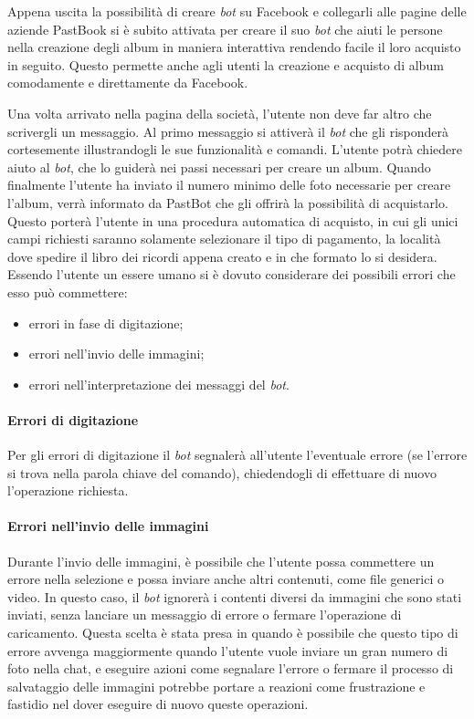 Appena uscita la possibilità di creare \textit{bot} su Facebook e collegarli
alle pagine
delle aziende PastBook si è subito attivata per creare il suo \textit{bot} che
aiuti le
persone nella creazione degli album in maniera interattiva rendendo facile il
loro acquisto in seguito. Questo permette anche agli utenti la creazione e
acquisto di album comodamente e direttamente da Facebook.

Una volta arrivato nella pagina della società, l'utente non deve far altro che
scrivergli un messaggio. Al primo messaggio si attiverà il \textit{bot} che
gli risponderà cortesemente illustrandogli le sue funzionalità e comandi.
L'utente potrà chiedere aiuto al \textit{bot}, che lo guiderà nei passi
necessari per
creare un album. Quando finalmente l'utente ha inviato il numero minimo delle
foto necessarie per creare l'album, verrà informato da PastBot che gli offrirà
la possibilità di acquistarlo. Questo porterà l'utente in una procedura
automatica di acquisto, in cui gli unici campi richiesti saranno solamente
selezionare il tipo di pagamento, la località dove spedire il libro dei
ricordi appena creato e in che formato lo si desidera. \\

Essendo l'utente un essere umano si è dovuto considerare dei possibili errori
che esso può commettere:
\begin{itemize}
  \item errori in fase di digitazione;
  \item errori nell'invio delle immagini;
  \item errori nell'interpretazione dei messaggi del \textit{bot}.
\end{itemize}

\paragraph*{Errori di digitazione} Per gli errori di digitazione il \textit{bot}
segnalerà all'utente l'eventuale errore (se l'errore si trova nella parola
chiave del comando), chiedendogli di effettuare di nuovo l'operazione richiesta.

\paragraph*{Errori nell'invio delle immagini} Durante l'invio delle immagini, è
possibile che l'utente possa commettere un errore nella selezione e possa
inviare anche altri contenuti, come file generici o video. In questo caso, il
\textit{bot} ignorerà i contenti diversi da immagini che sono stati inviati,
senza
lanciare un messaggio di errore o fermare l'operazione di caricamento. Questa
scelta è stata presa in quando è possibile che questo tipo di errore avvenga
maggiormente quando l'utente vuole inviare un gran numero di foto nella chat, e
eseguire azioni come segnalare l'errore o fermare il processo di salvataggio
delle immagini potrebbe portare a reazioni come frustrazione e fastidio nel
dover eseguire di nuovo queste operazioni.

